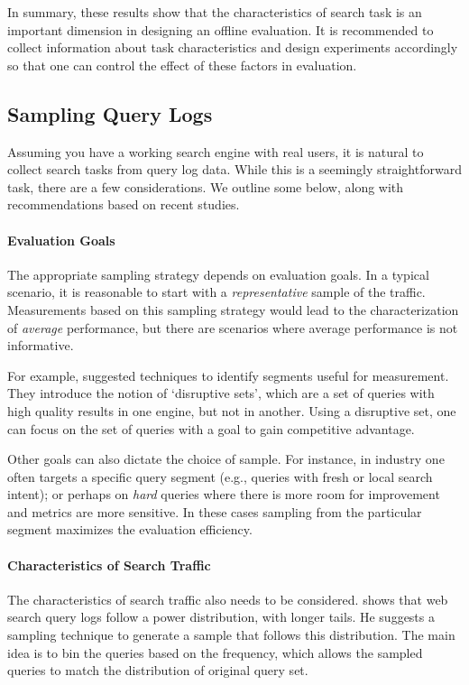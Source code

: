 In summary, these results show that the characteristics of search task is an important dimension in designing an offline evaluation. It is recommended to collect information about task characteristics and design experiments accordingly so that one can control the effect of these factors in evaluation.


\subsection{Sampling Query Logs}
Assuming you have a working search engine with real users, it is natural to collect search tasks from query log data. While this is a seemingly straightforward task, there are a few considerations. We outline some below, along with recommendations based on recent studies.

\paragraph{Evaluation Goals} The appropriate sampling strategy depends on evaluation goals. In a typical scenario, it is reasonable to start with a \textit{representative} sample of the traffic. Measurements based on this sampling strategy would lead to the characterization of \textit{average} performance, but there are scenarios where average performance is not informative. 

For example, \cite{Zaragoza:2010} suggested techniques to identify segments useful for measurement. They introduce the notion of `disruptive sets', which are a set of queries with high quality results in one engine, but not in another. Using a disruptive set, one can focus on the set of queries with a goal to gain competitive advantage.

Other goals can also dictate the choice of sample. For instance, in industry one often targets a specific query segment (e.g., queries with fresh or local search intent); or perhaps on \textit{hard} queries where there is more room for improvement and metrics are more sensitive. In these cases sampling from the particular segment maximizes the evaluation efficiency.

\paragraph{Characteristics of Search Traffic} The characteristics of search traffic also needs to be considered. \cite{Baeza-Yates:2015} shows that web search query logs follow a power distribution, with longer tails. He suggests a sampling technique to generate a sample that follows this distribution. The main idea is to bin the queries based on the frequency, which allows the sampled queries to match the distribution of original query set. 

